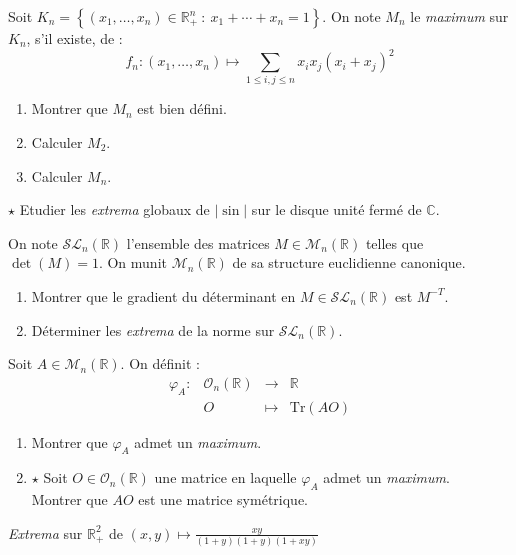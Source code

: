\documentclass[french,a4paper]{article}
\newcommand{\R}{\mathbb{R}}
\newcommand{\C}{\mathbb{C}}
\newcommand{\Tr}{\text{Tr}}
\theoremstyle{plain}
\theoremstyle{definition}
\theoremstyle{remark}
\begin{document}
\begin{ex}[Moulin.CD.46]{}
	Soit $K_n=\left\{(x_1,\ldots,x_n)\in\R_+^n\ : \ x_1+\cdots+x_n=1\right\}$. On note $M_n$ le \textit{maximum} sur $K_n$, s'il existe, de : $$f_n:(x_1,\ldots,x_n)\mapsto\sum_{1\leqslant i,j\leqslant n}x_ix_j(x_i+x_j)^2$$
	\begin{enumerate}
		\item Montrer que $M_n$ est bien défini.
		\item Calculer $M_2$. 
		\item Calculer $M_n$.
	\end{enumerate}
\end{ex}

\begin{ex}[Moulin.CD.47]{$\star$}
	Etudier les \textit{extrema} globaux de $\lvert \sin\rvert$ sur le disque unité fermé de $\C$.
\end{ex}

\begin{ex}[Moulin.CD.48]{}
	On note $\mathcal{SL}_n(\R)$ l'ensemble des matrices $M\in\mathcal{M}_n(\R)$ telles que $\det(M)=1$. On munit $\mathcal{M}_n(\R)$ de sa structure euclidienne canonique.
	\begin{enumerate}
		\item Montrer que le gradient du déterminant en $M\in\mathcal{SL}_n(\R)$ est $M^{-T}$.
		\item Déterminer les \textit{extrema} de la norme sur $\mathcal{SL}_n(\R)$.
	\end{enumerate}
\end{ex}

\begin{ex}[Moulin.CD.49]{}
	Soit $A\in\mathcal{M}_n(\R)$. On définit : $$\begin{array}{lrcl}
		\varphi_A:&\mathcal{O}_n(\R)&\longrightarrow&\R\\
		&O&\longmapsto&\Tr(AO)
	\end{array}$$
	\begin{enumerate}
		\item Montrer que $\varphi_A$ admet un \textit{maximum}.
		\item $\star$ Soit $O\in\mathcal{O}_n(\R)$ une matrice en laquelle $\varphi_A$ admet un \textit{maximum}. \\ Montrer que $AO$ est une matrice symétrique.
	\end{enumerate}
\end{ex}

\begin{ex}[Moulin.CD.50]{}
	\textit{Extrema} sur $\R_+^2$ de $(x,y)\mapsto\displaystyle\frac{xy}{(1+y)(1+y)(1+xy)}$
\end{ex}
\end{document}
